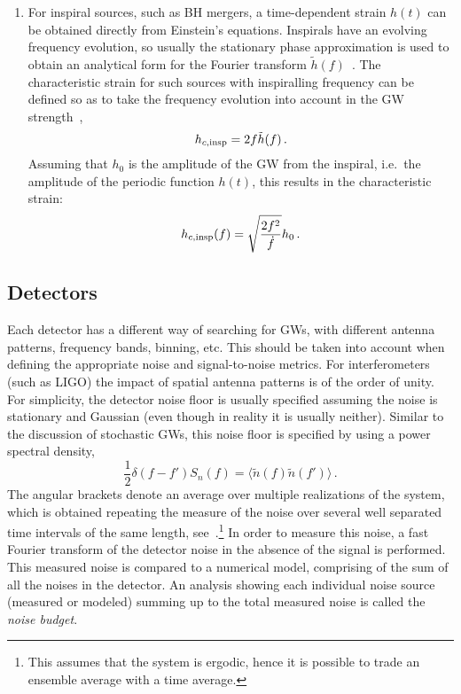 \documentclass[11pt,a4paper]{article}
\begin{document}
\begin{enumerate}
\item For inspiral sources, such as BH mergers, a time-dependent strain $h(t)$ can be obtained directly from Einstein's equations. Inspirals have an evolving frequency evolution, so usually the stationary phase approximation is used to obtain an analytical form for the Fourier transform  $\tilde{h}(f)$~\cite{Maggiore:1900zz}. The characteristic strain for such sources with inspiralling frequency can be defined so as to take the frequency evolution into account in the GW strength~\cite{Moore:2014sen},
\begin{equation}
\label{eq:hc}
    h_{c,\rm insp} = 2 f \tilde{h}(f) \,.%
\end{equation}
Assuming that $h_0$ is the amplitude of the GW from the inspiral, i.e.\ the amplitude of the periodic function $h(t)$, this results in the characteristic strain:
\begin{equation}
\label{eq:h0}
    h_{c,\rm insp}(f)   = \sqrt{\frac{2f^2}{\dot{f}}} h_0 \,.%
\end{equation}

\end{enumerate}

\subsection{Detectors}

Each detector has a different way of searching for GWs, with different antenna patterns, frequency bands, binning, etc. This should be taken into account when defining the appropriate noise and signal-to-noise metrics. For interferometers (such as LIGO) the impact of spatial antenna patterns is of the order of unity. For simplicity, the detector noise floor is usually specified assuming the noise is stationary and Gaussian (even though in reality it is usually neither). Similar to the discussion of stochastic GWs, this noise floor is specified by using a power spectral density,
\begin{equation}
	\frac{1}{2} \delta(f-f') S_n(f) = \langle \tilde{n}(f) \tilde{n}(f')\rangle \,.
\end{equation}
%
The angular brackets denote an average over multiple realizations of the system, which is obtained repeating the measure of the noise over several well separated time intervals of the same length, see~\cite{Maggiore:1900zz}.\footnote{This assumes that the system is ergodic, hence it is possible to trade an ensemble average with a time average.} In order to measure this noise,  a fast Fourier transform of the detector noise in the absence of the signal is performed. This measured noise is compared to a numerical model, comprising of the sum of all the noises in the detector. An analysis showing each individual noise source (measured or modeled) summing up to the total measured noise is called the \textit{noise budget}.
\end{document}
